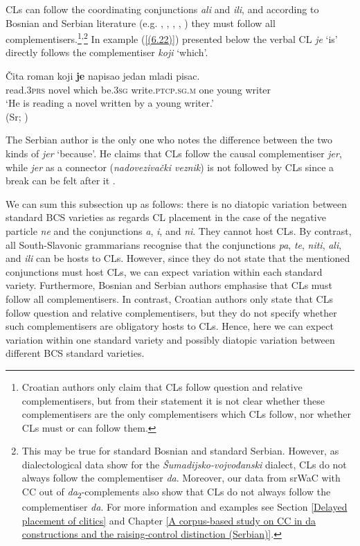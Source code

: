 \noindent CLs can follow the coordinating conjunctions \textit{ali} and \textit{ili}, and according to Bosnian and Serbian literature (e.g. \citealt[471]{JHP00}, \citealt[371]{StanojcicPopovic02}, \citealt[284, 298f]{Popovic04}, \citealt[562]{Ridjanovic12}, \citealt[451]{PiperKlajn14}) they must follow all complementisers.\footnote{Croatian authors \citet[595]{Baric97} only claim that CLs follow question and relative complementisers, but from their statement it is not clear whether these complementisers are the only complementisers which CLs follow, nor whether CLs must or can follow them.}\textsuperscript{,}\footnote{This may be true for standard Bosnian and standard Serbian. However, as dialectological data show for the \textit{Šumadijsko-vojvođanski} dialect, CLs do not always follow the complementiser \textit{da}. Moreover, our data from srWaC with CC out of \textit{da}\textsubscript{2}-complements also show that CLs do not always follow the complementiser \textit{da}. For more information and examples see Section \ref{Delayed placement of clitics} and Chapter \ref{A corpus-based study on CC in da constructions and the raising-control distinction (Serbian)}.} In example (\ref{(6.22)}) presented below the verbal CL \textit{je} `is’ directly follows the complementiser \textit{koji} `which’.

\begin{exe}\ex\label{(6.22)}
\gll Čita roman koji \textbf{je} napisao jedan mladi pisac.\\
 read\textsc{.3prs} novel which be\textsc{.3sg} write\textsc{.ptcp.sg.m} one young writer\\
\glt ‘He is reading a novel written by a young writer.’  \\
\hfill (Sr; \citealt[450]{PiperKlajn14})
\end{exe}

\noindent The Serbian author \citet[300f]{Popovic04} is the only one who notes the difference between the two kinds of \textit{jer} ‘because’. He claims that CLs follow the causal complementiser \textit{jer}, while \textit{jer} as a connector (\textit{nadovezivački veznik}) is not followed by CLs since a break can be felt after it \citep[cf.][300f]{Popovic04}. 

We can sum this subsection up as follows: there is no diatopic variation between standard BCS varieties as regards CL placement in the case of the negative particle \textit{ne} and the conjunctions \textit{a}, \textit{i}, and \textit{ni}. They cannot host CLs. By contrast, all South-Slavonic grammarians recognise that the conjunctions \textit{pa}, \textit{te}, \textit{niti}, \textit{ali}, and \textit{ili} can be hosts to CLs. However, since they do not state that the mentioned conjunctions must host CLs, we can expect variation within each standard variety. Furthermore, Bosnian and Serbian authors emphasise that CLs must follow all complementisers. In contrast, Croatian authors \citet[][595]{Baric97} only state that CLs follow question and relative complementisers, but they do not specify whether such complementisers are obligatory hosts to CLs. Hence, here we can expect variation within one standard variety and possibly diatopic variation between different BCS standard varieties.  

